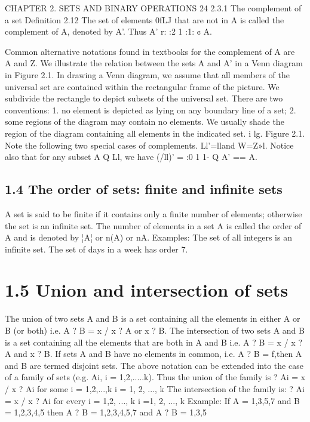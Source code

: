 {{{CHAPTER 2. SETS AND BINARY OPERATIONS 24
2.3.1 The complement of a set
Deﬁnition 2.12 The set of elements 0fLJ that are not in A is called the complement of A,
denoted by A’. Thus
A’ r: {:2 1 :1: ¢ A}.

Common alternative notations found in textbooks for the complement of A are ~ A and Z.
We illustrate the relation between the sets A and A’ in a Venn diagram in Figure 2.1. In drawing a
Venn diagram, we assume that all members of the universal set are contained within the rectangular
frame of the picture. We subdivide the rectangle to depict subsets of the universal set. There are
two conventions:
1. no element is depicted as lying on any boundary line of a set;
2. some regions of the diagram may contain no elements.
We usually shade the region of the diagram containing all elements in the indicated set. 
i
lg.
Figure 2.1.
Note the following two special cases of complements.
Ll'=lland W=Z»l.
Notice also that for any subset A Q Ll, we have
(/ll)’ = {:0 1 1- Q A'} == A.

\subsection{1.4 The order of sets: finite and infinite sets}
A set is said to be finite if it contains only a finite number of elements;
otherwise the set is an infinite set. The number of elements in a set A is
called the order of A and is denoted by ¦A¦ or n(A) or nA.
Examples:
The set of all integers is an infinite set.
The set of days in a week has order 7.

\section{1.5 Union and intersection of sets}
The union of two sets A and B is a set containing all the elements in
either A or B (or both)
i.e. A ? B = {x / x ? A or x ? B}.
The intersection of two sets A and B is a set containing all the elements
that are both in A and B
i.e. A ? B = {x / x ? A and x ? B}.
If sets A and B have no elements in common, i.e. A ? B = f,then A and B
are termed disjoint sets.
The above notation can be extended into the case of a family of sets (e.g.
Ai, i = 1,2,.....k). Thus the union of the family is
? Ai = {x / x ? Ai for some i = 1,2,...,k}
i = 1, 2, ..., k
The intersection of the family is:
? Ai = {x / x ? Ai for every i = 1,2, ..., k}
i =1, 2, ..., k
Example:
If A = {1,3,5,7} and B = {1,2,3,4,5} then A ? B = {1,2,3,4,5,7} and
A ? B = {1,3,5}
}}}
